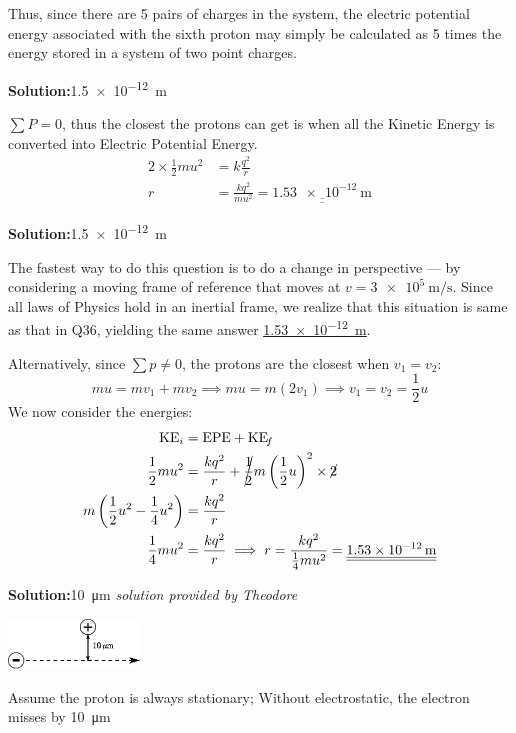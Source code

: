 \documentclass[11pt]{article}
\newcommand*\circled[1]{\tikz[baseline=(char.base)]{
		\node[shape=circle,draw,inner sep=2pt] (char) {#1};}}
\def\doubleunderline#1{\underline{\underline{#1}}}
\newcommand{\solution}[2]{\textbf{Solution:\hspace{1em}\circled{#1}}\hspace{1em}#2\hspace{1em}}
\newlength{\currentparskip}
\begin{document}
\begin{enumerate}[label={[Q\arabic*]},itemsep={1em}]
			Thus, since there are 5 pairs of charges in the system, the electric potential energy associated with the sixth proton may simply be calculated as 5 times the energy stored in a system of two point charges.
			
		\item \solution{B}{\SI{1.5e-12}{\meter}}
		
			$\sum P = 0$, thus the closest the protons can get is when all the Kinetic Energy is converted into Electric Potential Energy.
			\begin{align*}
				2\times \frac{1}{2}mu^2 &= k\frac{q^2}{r} \\
				r &= \frac{kq^2}{mu^2} = \doubleunderline{\SI{1.53e-12}{\meter}}
			\end{align*}
			
		\item \solution{B}{\SI{1.5e-12}{\meter}}
		
			The fastest way to do this question is to do a change in perspective --- by considering a moving frame of reference that moves at $v=\SI{3e5}{\meter\per\second}$. Since all laws of Physics hold in an inertial frame, we realize that this situation is same as that in Q36, yielding the same answer \doubleunderline{\SI{1.53e-12}{\meter}}.
			
			Alternatively, since $\sum p \neq 0$, the protons are the closest when $v_1 = v_2$:
			\begin{equation}
				mu = mv_1+mv_2 \implies mu = m \left(2v_1\right) \implies v_1 = v_2 = \frac{1}{2} u
			\end{equation}
			We now consider the energies:
			\begin{align*}
				\text{KE}_i &= \text{EPE} + \text{KE}_{\!f} \\
				\frac{1}{2} mu^2 &= \frac{kq^2}{r} + \cancel{\frac{1}{2}}m\left(\frac{1}{2}u\right)^2 \times \cancel{2} \\
				m\left(\frac{1}{2}u^2-\frac{1}{4}u^2\right) &= \frac{kq^2}{r} \\
				\frac{1}{4}mu^2 &= \frac{kq^2}{r} \implies r = \frac{kq^2}{\frac{1}{4}mu^2} = \doubleunderline{\SI{1.53e-12}{\meter}}
			\end{align*}
			
		\item \solution{C}{\SI{10}{\micro\meter}} \textit{\small solution provided by Theodore}
		
			\begin{minipage}[c]{4cm}
				\includegraphics[width=3.5cm]{38.eps}
			\end{minipage}%
			\setlength{\currentparskip}{\parskip}		%
			\begin{minipage}{\textwidth - 5.1cm}
				\setlength{\parskip}{\currentparskip}	%
				Assume the proton is always stationary; Without electrostatic, the electron misses by \SI{10}{\micro\meter}
				

\end{minipage}
\end{enumerate}
\end{document}
